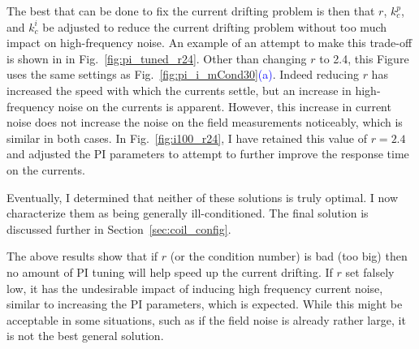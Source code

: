The best that can be done to fix the current drifting problem is then
that $r$, $k_c^p$, and $k_c^i$ be adjusted to reduce the current
drifting problem without too much impact on high-frequency noise.  An
example of an attempt to make this trade-off is shown in in
Fig.~\ref{fig:pi_tuned_r24}.  Other than changing $r$ to 2.4, this
Figure uses the same settings as
Fig.~\ref{fig:pi_i_mCond30}\textcolor{blue}{(a)}.  Indeed reducing $r$
has increased the speed with which the currents settle, but an
increase in high-frequency noise on the currents is apparent.
However, this increase in current noise does not increase
the noise on the field measurements noticeably, which is similar in both cases.
In Fig.~\ref{fig:i100_r24}, I have retained this value of $r=2.4$ and
adjusted the PI parameters to attempt to further improve the response
time on the currents.


Eventually, I determined that neither of these solutions is truly
optimal.  I now characterize them as being generally
ill-conditioned.  The final solution is discussed further in
Section~\ref{sec:coil_config}.

The above results show that if $r$ (or the condition number) is bad
(too big) then no amount of PI tuning will help speed up the current
drifting.  If $r$ set falsely low, it has the undesirable impact of
inducing high frequency current noise, similar to increasing the PI
parameters, which is expected. While this might be acceptable in some
situations, such as if the field noise is already rather large, it is
not the best general solution.
 





